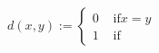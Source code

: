 \documentclass[preview]{standalone}
\begin{document}
\begin{align*}
d(x,y) := \begin{cases}0  &  \text{ if} x=y \\1 &  \text{ if}\end{cases}
\end{align*}
\end{document}

